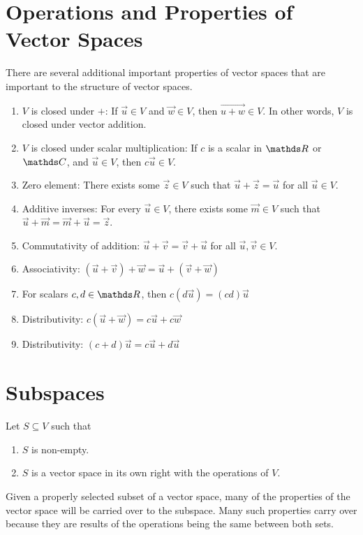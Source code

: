 \documentclass[11pt]{article}
\newcommand{\vek}[1]{\vec{#1}}
\begin{document}
\section*{Operations and Properties of Vector Spaces}
There are several additional important properties of vector spaces that are important to the structure of vector spaces.
\begin{enumerate}
\item{
$V$ is closed under $+$: If $\vek{u} \in V$ and $\vek{w} \in V$, then $\vek{u+w} \in V$. In other words, $V$ is closed under vector addition.
}
\item{
$V$ is closed under scalar multiplication: If $c$ is a scalar in $\bbR$ or $\bbC$, and $\vek{u} \in V$, then $c \vek{u} \in V$.
}
\item{
Zero element: There exists some $\vek{z} \in V$ such that $\vek{u} + \vek{z} = \vek{u}$ for all $\vek{u} \in V$.
}
\item{
Additive inverses: For every $\vek{u} \in V$, there exists some $\vek{m} \in V$ such that $\vek{u} + \vek{m} = \vek{m} + \vek{u} = \vek{z}$.
}
\item{
Commutativity of addition: $\vek{u} + \vek{v} = \vek{v} + \vek{u}$ for all $\vek{u}, \vek{v} \in V$.
}
\item{
Associativity: $\left( \vek{u} + \vek{v} \right) + \vek{w} = \vek{u} + \left( \vek{v} + \vek{w} \right)$
}
\item{
For scalars $c,d \in \bbR$, then $c \left( d \vek{u} \right) = (cd) \vek{u}$
}
\item{
Distributivity: $c \left( \vek{u} + \vek{w} \right) = c \vek{u} + c \vek{w}$
}
\item{
Distributivity: $(c+d) \vek{u} = c \vek{u} + d \vek{u}$
}
\end{enumerate}

\section*{Subspaces}
Let $S \subseteq V$ such that
\begin{enumerate}
\item{
$S$ is non-empty.
}
\item{
$S$ is a vector space in its own right with the operations of $V$.
}
\end{enumerate}

Given a properly selected subset of a vector space, many of the properties of the vector space will be carried over to the subspace. Many such properties carry over because they are results of the operations being the same between both sets.
\end{document}
